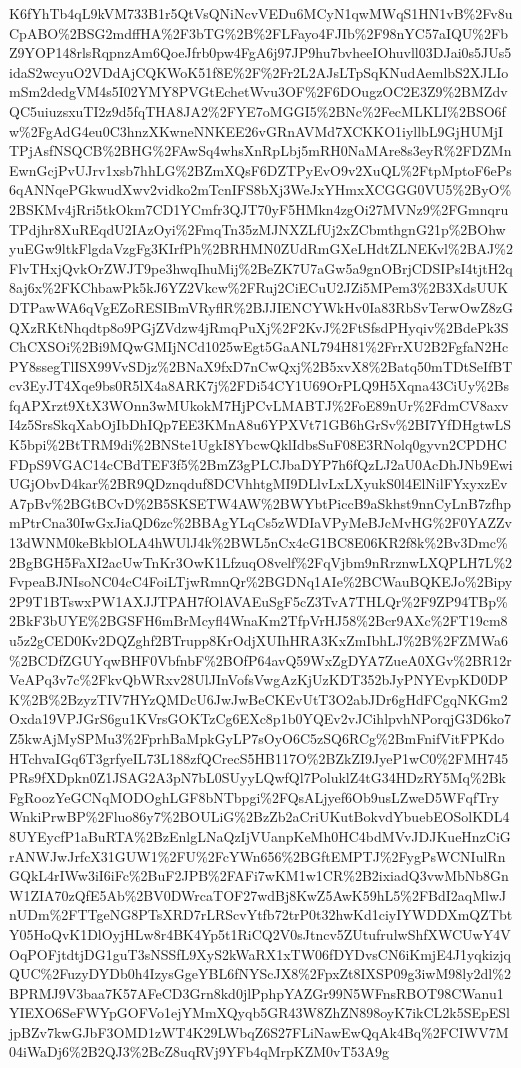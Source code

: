 \documentclass[11pt]{article}
\begin{document}
K6fYhTb4qL9kVM733B1r5QtVsQNiNcvVEDu6MCyN1qwMWqS1HN1vB\%2Fv8uCpABO\%2BSG2mdffHA\%2F3bTG\%2B\%2FLFayo4FJIb\%2F98nYC57aIQU\%2FbZ9YOP148rlsRqpnzAm6QoeJfrb0pw4FgA6j97JP9hu7bvheeIOhuvll03DJai0s5JUs5idaS2wcyuO2VDdAjCQKWoK51f8E\%2F\%2Fr2L2AJsLTpSqKNudAemlbS2XJLIomSm2dedgVM4s5I02YMY8PVGtEchetWvu3OF\%2F6DOugzOC2E3Z9\%2BMZdvQC5uiuzsxuTI2z9d5fqTHA8JA2\%2FYE7oMGGI5\%2BNc\%2FecMLKLI\%2BSO6fw\%2FgAdG4eu0C3hnzXKwneNNKEE26vGRnAVMd7XCKKO1iyllbL9GjHUMjITPjAsfNSQCB\%2BHG\%2FAwSq4whsXnRpLbj5mRH0NaMAre8s3eyR\%2FDZMnEwnGcjPvUJrv1xsb7hhLG\%2BZmXQsF6DZTPyEvO9v2XuQL\%2FtpMptoF6ePs6qANNqePGkwudXwv2vidko2mTcnIFS8bXj3WeJxYHmxXCGGG0VU5\%2ByO\%2BSKMv4jRri5tkOkm7CD1YCmfr3QJT70yF5HMkn4zgOi27MVNz9\%2FGmnqruTPdjhr8XuREqdU2IAzOyi\%2FmqTn35zMJNXZLfUj2xZCbmthgnG21p\%2BOhwyuEGw9ltkFlgdaVzgFg3KIrfPh\%2BRHMN0ZUdRmGXeLHdtZLNEKvl\%2BAJ\%2FlvTHxjQvkOrZWJT9pe3hwqIhuMij\%2BeZK7U7aGw5a9gnOBrjCDSIPsI4tjtH2q8aj6x\%2FKChbawPk5kJ6YZ2Vkcw\%2FRuj2CiECuU2JZi5MPem3\%2B3XdsUUKDTPawWA6qVgEZoRESIBmVRyflR\%2BJJIENCYWkHv0Ia83RbSvTerwOwZ8zGQXzRKtNhqdtp8o9PGjZVdzw4jRmqPuXj\%2F2KvJ\%2FtSfsdPHyqiv\%2BdePk3SChCXSOi\%2Bi9MQwGMIjNCd1025wEgt5GaANL794H81\%2FrrXU2B2FgfaN2HcPY8ssegTlISX99VvSDjz\%2BNaX9fxD7nCwQxj\%2B5xvX8\%2Batq50mTDtSeIfBTcv3EyJT4Xqe9bs0R5lX4a8ARK7j\%2FDi54CY1U69OrPLQ9H5Xqna43CiUy\%2BsfqAPXrzt9XtX3WOnn3wMUkokM7HjPCvLMABTJ\%2FoE89nUr\%2FdmCV8axvI4z5SrsSkqXabOjIbDhIQp7EE3KMnA8u6YPXVt71GB6hGrSv\%2BI7YfDHgtwLSK5bpi\%2BtTRM9di\%2BNSte1UgkI8YbcwQklIdbsSuF08E3RNolq0gyvn2CPDHCFDpS9VGAC14cCBdTEF3f5\%2BmZ3gPLCJbaDYP7h6fQzLJ2aU0AcDhJNb9EwiUGjObvD4kar\%2BR9QDznqduf8DCVhhtgMI9DLlvLxLXyukS0l4ElNilFYxyxzEvA7pBv\%2BGtBCvD\%2B5SKSETW4AW\%2BWYbtPiccB9aSkhst9nnCyLnB7zfhpmPtrCna30IwGxJiaQD6zc\%2BBAgYLqCs5zWDIaVPyMeBJcMvHG\%2F0YAZZv13dWNM0keBkblOLA4hWUlJ4k\%2BWL5nCx4cG1BC8E06KR2f8k\%2Bv3Dmc\%2BgBGH5FaXI2acUwTnKr3OwK1LfzuqO8velf\%2FqVjbm9nRrznwLXQPLH7L\%2FvpeaBJNIsoNC04cC4FoiLTjwRmnQr\%2BGDNq1AIe\%2BCWauBQKEJo\%2Bipy2P9T1BTswxPW1AXJJTPAH7fOlAVAEuSgF5cZ3TvA7THLQr\%2F9ZP94TBp\%2BkF3bUYE\%2BGSFH6mBrMcyfl4WnaKm2TfpVrHJ58\%2Bcr9AXc\%2FT19cm8u5z2gCED0Kv2DQZghf2BTrupp8KrOdjXUIhHRA3KxZmIbhLJ\%2B\%2FZMWa6\%2BCDfZGUYqwBHF0VbfnbF\%2BOfP64avQ59WxZgDYA7ZueA0XGv\%2BR12rVeAPq3v7c\%2FkvQbWRxv28UlJInVofsVwgAzKjUzKDT352bJyPNYEvpKD0DPK\%2B\%2BzyzTIV7HYzQMDcU6JwJwBeCKEvUtT3O2abJDr6gHdFCgqNKGm2Oxda19VPJGrS6gu1KVrsGOKTzCg6EXc8p1b0YQEv2vJCihlpvhNPorqjG3D6ko7Z5kwAjMySPMu3\%2FprhBaMpkGyLP7sOyO6C5zSQ6RCg\%2BmFnifVitFPKdoHTchvaIGq6T3grfyeIL73L188zfQCrecS5HB117O\%2BZkZI9JyeP1wC0\%2FMH745PRs9fXDpkn0Z1JSAG2A3pN7bL0SUyyLQwfQl7PoluklZ4tG34HDzRY5Mq\%2BkFgRoozYeGCNqMODOghLGF8bNTbpgi\%2FQsALjyef6Ob9usLZweD5WFqfTryWnkiPrwBP\%2Fluo86y7\%2BOULiG\%2BzZb2aCriUKutBokvdYbuebEOSolKDL48UYEycfP1aBuRTA\%2BzEnlgLNaQzIjVUanpKeMh0HC4bdMVvJDJKueHnzCiGrANWJwJrfcX31GUW1\%2FU\%2FcYWn656\%2BGftEMPTJ\%2FygPsWCNIulRnGQkL4rIWw3iI6iFc\%2BuF2JPB\%2FAFi7wKM1w1CR\%2B2ixiadQ3vwMbNb8GnW1ZIA70zQfE5Ab\%2BV0DWrcaTOF27wdBj8KwZ5AwK59hL5\%2FBdI2aqMlwJnUDm\%2FTTgeNG8PTsXRD7rLRScvYtfb72trP0t32hwKd1ciyIYWDDXmQZTbtY05HoQvK1DlOyjHLw8r4BK4Yp5t1RiCQ2V0sJtncv5ZUtufrulwShfXWCUwY4VOqPOFjtdtjDG1guT3sNSSfL9XyS2kWaRX1xTW06fDYDvsCN6iKmjE4J1yqkizjqQUC\%2FuzyDYDb0h4IzysGgeYBL6fNYScJX8\%2FpxZt8IXSP09g3iwM98ly2dl\%2BPRMJ9V3baa7K57AFeCD3Grn8kd0jlPphpYAZGr99N5WFnsRBOT98CWanu1YIEXO6SeFWYpGOFVo1ejYMmXQyqb5GR43W8ZhZN898oyK7ikCL2k5SEpESljpBZv7kwGJbF3OMD1zWT4K29LWbqZ6S27FLiNawEwQqAk4Bq\%2FCIWV7M04iWaDj6\%2B2QJ3\%2BcZ8uqRVj9YFb4qMrpKZM0vT53A9g
\end{document}
